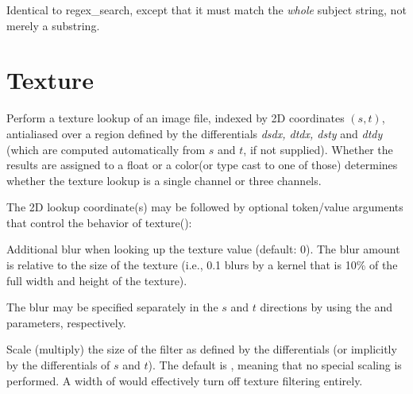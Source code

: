 \documentclass[11pt,letterpaper]{book}
\def\color{{\cf color}\xspace}
\def\float{{\cf float}\xspace}
\begin{document}
\apiend

Identical to {\cf regex_search}, except that it must match the
\emph{whole} {\cf subject} string, not merely a substring.
\apiend




\section{Texture}
\label{sec:stdlib:texture}


Perform a texture lookup of an image file, indexed by 2D coordinates
$(s,t)$, antialiased over a region defined by the differentials
\emph{dsdx, dtdx, dsty} and \emph{dtdy} (which are computed
automatically from $s$ and $t$, if not supplied).  Whether the results
are assigned to a \float or a \color (or type cast to one of those)
determines whether the texture lookup is a single channel or three
channels.

The 2D lookup coordinate(s) may be followed by optional token/value
arguments that control the behavior of {\cf texture()}:

\vspace{12pt}
Additional blur when looking up the texture value (default: 0).  The
blur amount is relative to the size of the texture (i.e., 0.1 blurs by a
kernel that is 10\% of the full width and height of the texture).

The blur may be specified separately in the $s$ and $t$ directions by
using the  and  parameters, respectively.
\apiend
\vspace{-16pt}

\vspace{12pt}
Scale (multiply) the size of the filter as defined by the differentials
(or implicitly by the differentials of $s$ and $t$).  The default is
{}, meaning that no special scaling is performed.  A width of
{} would effectively turn off texture filtering entirely.
\end{document}
